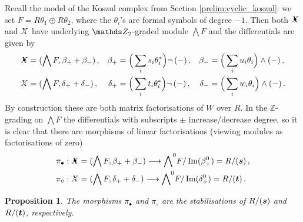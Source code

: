 \documentclass{compositio}
\newtheorem{proposition}[theorem]{Proposition}
\theoremstyle{definition}
\numberwithin{equation}{section}
\def\Im{\operatorname{Im}}
\begin{document}
Recall the model of the Koszul complex from Section \ref{prelim:cyclic_koszul}: we set $F = R \theta_1 \oplus R \theta_2$, where the $\theta_{i}$'s are formal symbols of degree $-1$. Then both $\Xbul$ and $\Xcirc$ have underlying $\Ztwo$-graded module $\bigwedge F$ and the differentials are given by
\begin{align*}
\Xbul & = ( \bigwedge F, \beta_+ + \beta_{-}) \, , & \beta_+ & = \Big(\sum_i s_i \theta_i^*\Big) \neg\, (-) \, , & \beta_{-} & = \Big(\sum_i u_i \theta_i\Big) \wedge (-) \, , \\
\Xcirc & = ( \bigwedge F, \delta_+ + \delta_{-}) \, , & \delta_+ & = \Big(\sum_i t_i \theta_i^*\Big) \neg\, (-) \, , & \delta_{-} & = \Big(\sum_i w_i \theta_i\Big) \wedge (-) \, .
\end{align*}
By construction these are both matrix factorisations of $W$ over $R$. In the $\mathds{Z}$-grading on $\bigwedge F$ the differentials with subscripts $\pm$ increase/decrease degree, so it is clear that there are morphisms of linear factorisations (viewing modules as factorisations of zero)
\begin{align*}
& \pi_{\bullet}: \Xbul = ( \bigwedge F, \beta_+ + \beta_{-}) \lto {\bigwedge}^0 F/\Im(\beta_+^0) = R/(\boldsymbol{s}) \, ,\\
& \pi_{\circ}: \Xcirc = ( \bigwedge F, \delta_+ + \delta_{-}) \lto {\bigwedge}^0 F/\Im(\delta_+^0) = R/(\boldsymbol{t}) \, .
\end{align*}

\begin{proposition} The morphisms $\pi_{\bullet}$ and $\pi_{\circ}$ are the stabilisations of $R/(\boldsymbol{s})$ and $R/(\boldsymbol{t})$, respectively.
\end{proposition}
\end{document}
